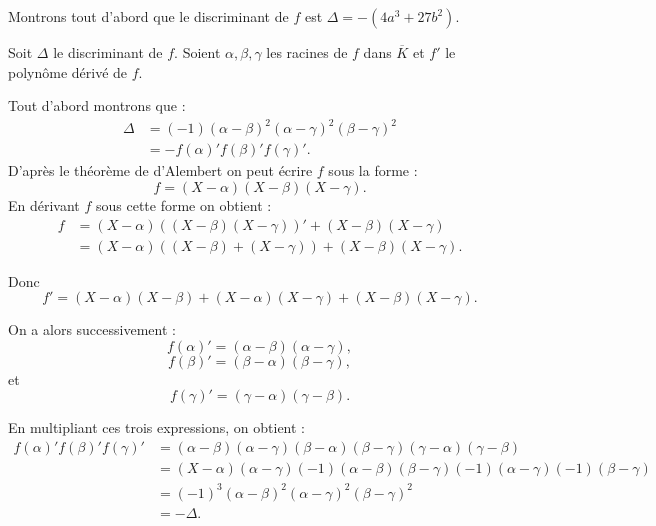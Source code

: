 \begin{demonstration}
    Montrons tout d'abord que le discriminant de $f$ est $\Delta= -(4a^3 + 27b^2)$.

    Soit $\Delta$ le discriminant de $f$. Soient $\alpha, \beta, \gamma $ les racines de $f$ dans $\overline{K}$ et $f'$ le polynôme dérivé de $f$.

    Tout d'abord montrons que :
    \begin{align*}
        \Delta &= (-1) ( \alpha - \beta )^2 ( \alpha - \gamma )^2 ( \beta - \gamma )^2 \\
          &= - f(\alpha)'f(\beta )'f(\gamma)'
    .\end{align*}
    D'après le théorème de d'Alembert on peut écrire $f$ sous la forme :
    \[
        f = \left( X - \alpha \right) \left( X - \beta \right) \left( X - \gamma \right) 
    .\] 
    En dérivant $f$ sous cette forme on obtient :
    \begin{align*}
        f &= ( X - \alpha ) \left( ( X - \beta ) ( X - \gamma ) \right)'  + ( X - \beta ) ( X - \gamma )\\
          &= ( X - \alpha ) \left( ( X - \beta ) + ( X - \gamma ) \right) + ( X - \beta ) ( X - \gamma ) 
    .\end{align*}

    Donc  
\[
f' = ( X - \alpha ) ( X - \beta ) + ( X - \alpha ) ( X - \gamma ) + ( X - \beta ) ( X - \gamma )
.\] 

On a alors successivement : 
\[
    f(\alpha)' = ( \alpha - \beta) ( \alpha - \gamma )
,\] 
\[
f(\beta )' = ( \beta - \alpha) ( \beta - \gamma)
,\] 
et
\[
f(\gamma)' = ( \gamma - \alpha) ( \gamma - \beta)
.\] 

En multipliant ces trois expressions, on obtient :
\begin{align*}
    f(\alpha)' f(\beta )' f(\gamma)' &= ( \alpha - \beta ) ( \alpha - \gamma ) ( \beta - \alpha ) ( \beta - \gamma) ( \gamma - \alpha ) ( \gamma - \beta ) \\
&= \left( X - \alpha \right) \left( \alpha - \gamma \right) \left( -1 \right) \left( \alpha - \beta  \right) \left( \beta - \gamma \right) \left( -1 \right) \left( \alpha - \gamma \right) \left( -1 \right) \left( \beta - \gamma \right) \\
&= \left( -1 \right) ^3 \left( \alpha - \beta  \right) ^2 \left( \alpha - \gamma  \right) ^2 \left( \beta - \gamma \right) ^2\\
 &= - \Delta
.\end{align*}


\end{demonstration}
